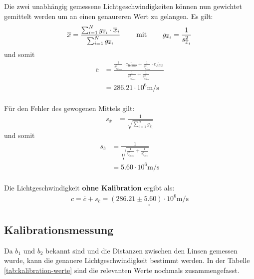 Die  zwei  unabh\"angig gemessene Lichtgeschwindigkeiten k\"onnen nun  gewichtet
gemittelt werden um an einen genaureren Wert zu gelangen. Es gilt:
\begin{align*}
    \overline{x}  &= \frac{\sum_{i=1}^{N} g_{\overline{x}_i} \cdot \overline{x}_i}{\sum_{i=1}^{N} g_{\overline{x}_i}} \hspace{8mm}\textrm{mit}\hspace{8mm} g_{\overline{x}_i} = \frac{1}{s^2_{\overline{x}_i}} \\
\end{align*}
und somit
\begin{align*}
    \overline{c}  &= \frac{ \frac{1}{s_{\overline{c_{Remo}}}^2} \cdot \overline{c_{Remo}} + \frac{1}{s_{\overline{c_{Alex}}}^2} \cdot \overline{c_{Alex}} }
                          { \frac{1}{s_{\overline{c_{Remo}}}^2} + \frac{1}{s_{\overline{c_{Alex}}}^2} } \\
                  &= 286.21 \cdot 10^6 \textrm{m}/\textrm{s} \\
\end{align*}

F\"ur den Fehler des gewogenen Mittels gilt:
\begin{align*}
    s_{\overline{x}} &= \frac{1}{\sqrt{\sum_{i=1}^{N} g_{\overline{x}_i}}}
\end{align*}
und somit
\begin{align*}
    s_{\overline{c}} &= \frac{1}{ \sqrt{\frac{1}{s_{\overline{c_{Remo}}}^2} + \frac{1}{s_{\overline{c_{Alex}}}^2}}} \\
                     &= 5.60 \cdot 10^6 \textrm{m}/\textrm{s} \\
\end{align*}

Die Lichtgeschwindigkeit \textbf{ohne Kalibration} ergibt als:
\begin{align*}
    c = \overline{c} + s_{\overline{c}} = \underline{\underline{(286.21 \pm 5.60) \cdot 10^6 \textrm{m}/\textrm{s}}}
\end{align*}


\subsection{Kalibrationsmessung}

Da $b_1$ und $b_2$ bekannt sind und die Distanzen zwischen den Linsen gemessen
wurde, kann die genauere Lichtgeschwindigkeit bestimmt werden. In  der Tabelle
\ref{tab:kalibration-werte}    sind    die     relevanten    Werte    nochmals
zusammengefasst.

